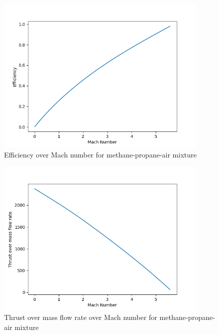 \documentclass[a4paper,11pt]{article}
\begin{document}
	\begin{figure}[H]
		\centering
		\includegraphics[width=0.9\textwidth]{Metan(2mol)_propan(1mol)_pow/Efficiency_over_Mach.png}
       		\caption{Efficiency over Mach number for methane-propane-air mixture}
	\end{figure}
	\begin{figure}[H]
		\centering
		\includegraphics[width=0.9\textwidth]{Metan(2mol)_propan(1mol)_pow/Thrust_over_mass_flow_rate_over_Mach.png}
       		\caption{Thrust over mass flow rate over Mach number for methane-propane-air mixture}
	\end{figure}
\end{document}
